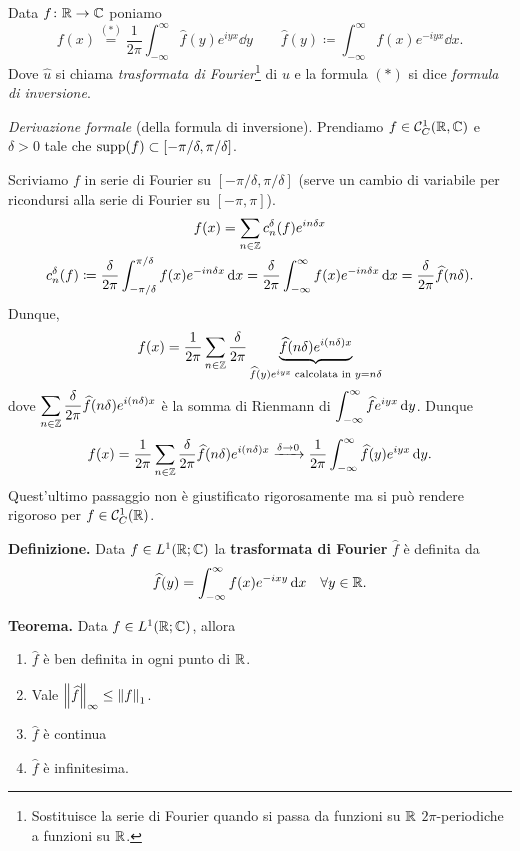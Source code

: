 Data $f \colon \mathbb R \to \mathbb C$ poniamo
%
$$
	f(x) \overset{(\ast)}{=} \frac{1}{2\pi} \int_{-\infty}^\infty \hat{f}(y) e^{iyx} \dd y 
	\qquad \hat{f}(y) \coloneqq \int_{-\infty}^\infty f(x) e^{-iyx} \dd x.
$$
%
Dove $\hat{u}$ si chiama \textit{trasformata di Fourier}\footnote{Sostituisce la serie di Fourier quando si passa da funzioni su $\mathbb R$ $2\pi$-periodiche a funzioni su $\mathbb R$.} di $u$ e la formula $(\ast)$ si dice \textit{formula di inversione}.

\textit{Derivazione formale} (della formula di inversione).
Prendiamo $f \in \mathcal{C}_C^1(\mathbb R,\mathbb C)$ e $\delta > 0$ tale che $\operatorname{supp}(f) \subset [-\pi / \delta, \pi / \delta]$. 

Scriviamo $f$ in serie di Fourier su $[-\pi / \delta, \pi / \delta]$ (serve un cambio di variabile per ricondursi alla serie di Fourier su $[-\pi,\pi]$).
%
\begin{gather*}
	f(x) = \sum_{n \in \mathbb Z} c_n^\delta (f) e^{in \delta x} \\
	c_n^\delta (f) \coloneqq \frac{\delta}{2\pi} \int_{-\pi / \delta}^{\pi / \delta} f(x) e^{-in \delta x} \,\mathrm{d} x
	= \frac{\delta}{2\pi} \int_{-\infty}^\infty f(x) e^{-in \delta x} \,\mathrm{d} x
	= \frac{\delta}{2\pi} \widehat{f}(n\delta).
\end{gather*}
Dunque,
%
$$
	f(x) = \frac{1}{2\pi} \sum_{n \in \mathbb Z} \frac{\delta}{2\pi} \underbrace{\widehat{f}(n\delta) e^{i(n\delta)x}}_{\widehat{f}(y) e^{iyx} \; \text{calcolata in } y = n\delta}
$$
%
dove $\displaystyle \sum_{n \in \mathbb Z} \frac{\delta}{2\pi}\widehat{f}(n\delta) e^{i(n\delta)x} $ è la somma di Rienmann di $\displaystyle \int_{-\infty}^{\infty} \widehat{f} e^{iyx} \,\mathrm{d} y$.
Dunque
%
$$
	f(x) = \frac{1}{2\pi} \sum_{n \in \mathbb Z} \frac{\delta}{2\pi} \widehat{f}(n\delta) e^{i(n\delta)x}
	\xrightarrow{\delta \to 0}
	\frac{1}{2\pi} \int_{-\infty}^{\infty} \widehat{f}(y) e^{iyx} \,\mathrm{d} y.
$$
%
Quest'ultimo passaggio non è giustificato rigorosamente ma si può rendere rigoroso per $f \in \mathcal{C}_C^1(\mathbb R)$.

\vss

\textbf{Definizione.} Data $f \in L^1(\mathbb R; \mathbb C)$ la \textbf{trasformata di Fourier} $\hat{f}$ è definita da
%
$$
	\widehat{f}(y) = \int_{-\infty}^\infty f(x) e^{-ixy} \,\mathrm{d} x \quad \forall y \in \mathbb R.
$$
%

\newpage

\textbf{Teorema.} Data $f \in L^1(\mathbb R;\mathbb C)$, allora
\begin{enumerate}

	\item $\hat{f}$ è ben definita in ogni punto di $\mathbb R$.

	\item Vale $\left\lVert \widehat{f} \right\rVert_\infty \leq \left\lVert f \right\rVert_1$.

	\item $\hat{f}$ è continua

	\item $\hat{f}$ è infinitesima.

\end{enumerate}


